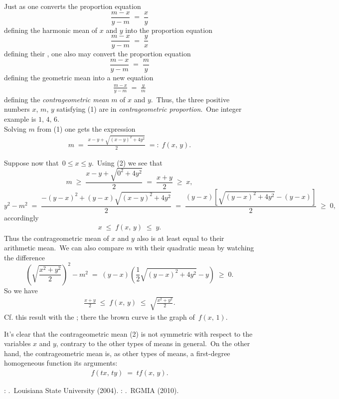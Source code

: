 \documentclass[12pt]{article}
\theoremstyle{definition}
\begin{document}
Just as one converts the proportion equation 
$$\frac{m\!-\!x}{y\!-\!m} \;=\; \frac{x}{y}$$
defining the harmonic mean of $x$ and $y$ into the proportion equation 
$$\frac{m\!-\!x}{y\!-\!m} \;=\; \frac{y}{x}$$
defining their , one also may convert the proportion 
equation 
$$\frac{m\!-\!x}{y\!-\!m} \;=\; \frac{m}{y}$$
defining the geometric mean into a new equation 
\begin{align}
\frac{m\!-\!x}{y\!-\!m} \;=\; \frac{y}{m}
\end{align}
defining the {\it contrageometric mean} $m$ of $x$ and $y$.\, Thus, the 
three positive numbers $x$, $m$, $y$ satisfying (1) are in {\it 
contrageometric proportion}.\, One integer example is 
$1,\,4,\,6$.\\
 
Solving $m$ from (1) one gets the expression
\begin{align}
m \;=\; \frac{x\!-\!y+\sqrt{(x\!-\!y)^2+4y^2}}{2} \;=:\; f(x,\,y).
\end{align}

Suppose now that\, $0 \le x \le y$.\, Using (2) we see that
$$m \;\ge\; \frac{x\!-\!y+\sqrt{0^2\!+\!4y^2}}{2} \;=\; \frac{x\!+\!y}{2} 
\;\ge\; x,$$
$$y^2\!-\!m^2 \;=\; 
\frac{-(y\!-\!x)^2+(y\!-\!x)\sqrt{(x\!-\!y)^2+4y^2}}{2} \;=\; 
\frac{(y\!-\!x)[\sqrt{(y\!-\!x)^2+4y^2}-(y\!-\!x)]}{2} \;\ge\; 0,$$
accordingly
\begin{align}
x \;\le\; f(x,\,y) \;\le\; y.
\end{align}
Thus the contrageometric mean of $x$ and $y$ also is at least equal to 
their arithmetic mean.\, We can also compare $m$ with their quadratic mean by watching the difference
$$\left(\sqrt{\frac{x^2\!+\!y^2}{2}}\right)^2-m^2 \;=\; (y\!-\!x)\left(\frac{1}{2}\sqrt{(y\!-\!x)^2+4y^2}-y\right)
\;\ge\; 0.$$
So we have
\begin{align}
\frac{x\!+\!y}{2}\;\le\; f(x,\,y) \;\le\; \sqrt{\frac{x^2\!+\!y^2}{2}}.
\end{align}
Cf. this result with the ; there the brown curve is the graph of\, $f(x,\,1)$.

It's clear that the contrageometric mean (2) is not symmetric with 
respect to the variables $x$ and $y$, contrary to the other types of 
means in general.\, On the other hand, the contrageometric mean is, as other types of means, a first-degree homogeneous function its arguments:
\begin{align}
f(tx,\,ty) \;=\; tf(x,\,y).
\end{align}

\begin{thebibliography}{8}
: .\, Louisiana State University (2004).
: .\, RGMIA (2010).
\end{thebibliography}

\end{document}
